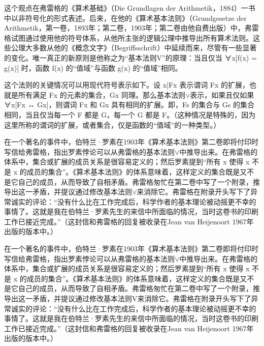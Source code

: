 这个观点在弗雷格的《算术基础》（Die Grundlagen der Arithmetik，1884）一书中以非符号化的形式表述。后来，在他的《算术基本法则》（Grundgesetze der Arithmetik，第一卷，1893年；第二卷，1903年；第二卷由他自费出版）中，弗雷格试图通过使用他的符号体系，从他所主张的逻辑公理中推导出所有算术法则。这些公理大多数从他的《概念文字》（Begriffsschrift）中延续而来，尽管有一些显著的变化。唯一真正的新原则是他称之为“基本法则V”的原理：当且仅当 ∀x[f(x) = g(x)] 时，函数 f(x) 的“值域”与函数 g(x) 的“值域”相同。

这个法则的关键情况可以用现代符号表示如下。设 {x|Fx} 表示谓词 Fx 的扩展，也就是所有满足 Fx 的元素的集合，Gx 同理。那么基本法则\(\lor\)表示，如果且仅如果 ∀x[Fx ↔ Gx]，则谓词 Fx 和 Gx 具有相同的扩展。即，Fs 的集合与 Gs 的集合相同，当且仅当每一个 F 都是 G，每一个 G 都是 F。（这种情况是特殊的，因为这里所称的谓词的扩展，或者集合，仅是函数的“值域”的一种类型。）

在一个著名的事件中，伯特兰·罗素在1903年《算术基本法则》第二卷即将付印时写信给弗雷格，指出罗素悖论可以从弗雷格的基本法则\(\lor\)中推导出来。在弗雷格的体系中，集合或扩展的成员关系是很容易定义的；然后罗素提到“所有 x 使得 x 不是 x 的成员的集合”。《算术基本法则》的体系意味着，这样定义的集合既是又不是它自己的成员，从而导致了自相矛盾。弗雷格匆忙在第二卷中写了一个附录，推导出这一矛盾，并提议通过修改基本法则\(\lor\)来消除它。弗雷格在附录开头写下了异常诚实的评论：“没有什么比在工作完成后，科学作者的基本理论被动摇更不幸的事情了。这就是我在伯特兰·罗素先生的来信中所面临的情况，当时这卷书的印刷工作已接近完成。”（这封信和弗雷格的回复被收录在Jean van Heijenoort 1967年出版的版本中。）

在一个著名的事件中，伯特兰·罗素在1903年《算术基本法则》第二卷即将付印时写信给弗雷格，指出罗素悖论可以从弗雷格的基本法则\(\lor\)中推导出来。在弗雷格的体系中，集合或扩展的成员关系是很容易定义的；然后罗素提到“所有 x 使得 x 不是 x 的成员的集合”。《算术基本法则》的体系意味着，这样定义的集合既是又不是它自己的成员，从而导致了自相矛盾。弗雷格匆忙在第二卷中写了一个附录，推导出这一矛盾，并提议通过修改基本法则V来消除它。弗雷格在附录开头写下了异常诚实的评论：“没有什么比在工作完成后，科学作者的基本理论被动摇更不幸的事情了。这就是我在伯特兰·罗素先生的来信中所面临的情况，当时这卷书的印刷工作已接近完成。”（这封信和弗雷格的回复被收录在Jean van Heijenoort 1967年出版的版本中。）

